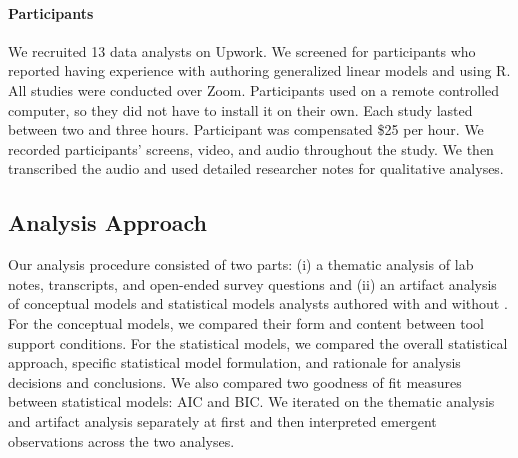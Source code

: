 \noindent \paragraph{Participants} We recruited 13 data analysts on Upwork. We
screened for participants who reported having experience with authoring
generalized linear models and using R.  All studies were conducted over Zoom. Participants used \rTisane
on a remote controlled computer, so they did not have to install it on their
own. Each study lasted between two and three hours. Participant was compensated
\$25 per hour. We recorded participants' screens, video, and audio throughout
the study. We then transcribed the audio and used detailed researcher notes for
qualitative analyses.


\subsection{Analysis Approach}
Our analysis procedure consisted of two parts: (i) a thematic analysis of lab
notes, transcripts, and open-ended survey questions and (ii) an artifact
analysis of conceptual models and statistical models analysts authored with and
without \rTisane. For the conceptual models, we compared their form and content
between tool support conditions. For the statistical models, we compared the
overall statistical approach, specific statistical model formulation, and
rationale for analysis decisions and conclusions. We also compared two goodness
of fit measures between statistical models: AIC and BIC. We iterated on the
thematic analysis and artifact analysis separately at first and then interpreted
emergent observations across the two analyses. 

